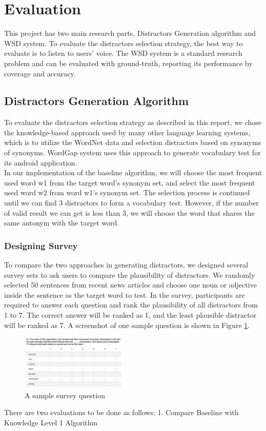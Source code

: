 \section{Evaluation}
This project has two main research parts, Distractors Generation algorithm and WSD system. To evaluate the distractors selection strategy, the best way to evaluate is to listen to users' voice. The WSD system is a standard research problem and can be evaluated with ground-truth, reporting its performance
by coverage and accuracy.
\subsection{Distractors Generation Algorithm}
To evaluate the distractors selection strategy as described in this report, we chose the knowledge-based approach used by many other language learning systems, which is to utilize the WordNet data and selection distractors based on synonyms of synonyms. WordGap system uses this approach to generate vocabulary test for its android application.
\\
In our implementation of the baseline algorithm, we will choose the most frequent used word w1 from the target word’s synonym set, and select the most frequent used word w2 from word w1’s synonym set. The selection process is continued until we can find 3 distractors to form a vocabulary test. However, if the number of valid result we can get is less than 3, we will choose the word that shares the same antonym with the target word.
\\
\subsubsection{Designing Survey}
To compare the two approaches in generating distractors, we designed several survey sets to ask users to compare the plausibility of distractors. We randomly selected 50 sentences from recent news articles and choose one noun or adjective inside the sentence as the target word to test. In the survey, participants are required to answer each question and rank the plausibility of all distractors from 1 to 7. The correct answer will be ranked as 1, and the least plausible distractor will be ranked as 7. A screenshot of one sample question is shown in Figure \ref{fig:distractor_1}.
\\
\begin{figure}[ht]
   \centering
   \includegraphics[width=0.45\textwidth]{distractor_1.jpg}
   \caption{A sample survey question}
   \label{fig:distractor_1}
\end{figure}
There are two evaluations to be done as follows:
1.  Compare Baseline with Knowledge Level 1 Algorithm

